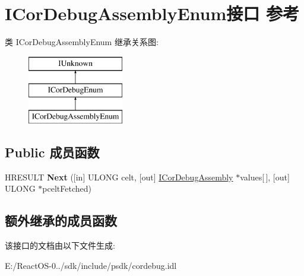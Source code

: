 \hypertarget{interface_i_cor_debug_assembly_enum}{}\section{I\+Cor\+Debug\+Assembly\+Enum接口 参考}
\label{interface_i_cor_debug_assembly_enum}
类 I\+Cor\+Debug\+Assembly\+Enum 继承关系图\+:\begin{figure}[H]
\begin{center}
\leavevmode
\includegraphics[height=3.000000cm]{interface_i_cor_debug_assembly_enum}
\end{center}
\end{figure}
\subsection*{Public 成员函数}
\begin{DoxyCompactItemize}
\item 
\mbox{\label{interface_i_cor_debug_assembly_enum_a0f239586970125cf957aec99d83208e2}} 
H\+R\+E\+S\+U\+LT {\bfseries Next} (\mbox{[}in\mbox{]} U\+L\+O\+NG celt, \mbox{[}out\mbox{]} \hyperlink{interface_i_cor_debug_assembly}{I\+Cor\+Debug\+Assembly} $\ast$values\mbox{[}$\,$\mbox{]}, \mbox{[}out\mbox{]} U\+L\+O\+NG $\ast$pcelt\+Fetched)
\end{DoxyCompactItemize}
\subsection*{额外继承的成员函数}


该接口的文档由以下文件生成\+:\begin{DoxyCompactItemize}
\item 
E\+:/\+React\+O\+S-\/0../sdk/include/psdk/cordebug.\+idl\end{DoxyCompactItemize}
